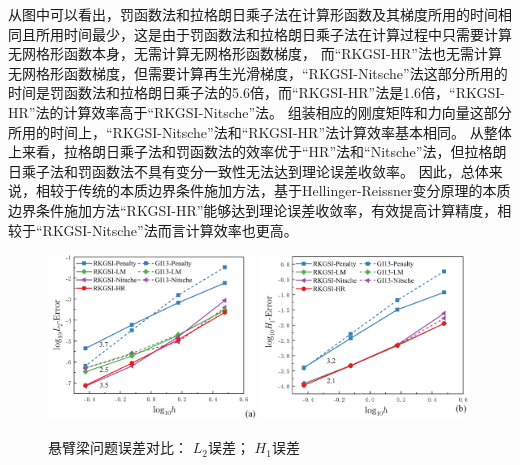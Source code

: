 从图中可以看出，罚函数法和拉格朗日乘子法在计算形函数及其梯度所用的时间相同且所用时间最少，这是由于罚函数法和拉格朗日乘子法在计算过程中只需要计算无网格形函数本身，无需计算无网格形函数梯度，
而“RKGSI-HR”法也无需计算无网格形函数梯度，但需要计算再生光滑梯度，“RKGSI-Nitsche”法这部分所用的时间是罚函数法和拉格朗日乘子法的5.6倍，而“RKGSI-HR”法是1.6倍，“RKGSI-HR”法的计算效率高于“RKGSI-Nitsche”法。
组装相应的刚度矩阵和力向量这部分所用的时间上，“RKGSI-Nitsche”法和“RKGSI-HR”法计算效率基本相同。
从整体上来看，拉格朗日乘子法和罚函数法的效率优于“HR”法和“Nitsche”法，但拉格朗日乘子法和罚函数法不具有变分一致性无法达到理论误差收敛率。
因此，总体来说，相较于传统的本质边界条件施加方法，基于Hellinger-Reissner变分原理的本质边界条件施加方法“RKGSI-HR”能够达到理论误差收敛率，有效提高计算精度，相较于“RKGSI-Nitsche”法而言计算效率也更高。
\begin{figure}[H]
\centering
\begin{subcaptiongroup}
    \includegraphics[width=0.49\textwidth]{figure/EHR/cantilever/L2.png}
    \label{ECL2}
    \includegraphics[width=0.49\textwidth]{figure/EHR/cantilever/H1.png}
    \label{ECH1}
    \end{subcaptiongroup}
\caption{悬臂梁问题误差对比： $L_2$误差； $H_1$误差}
\label{ECLH}
\end{figure}
